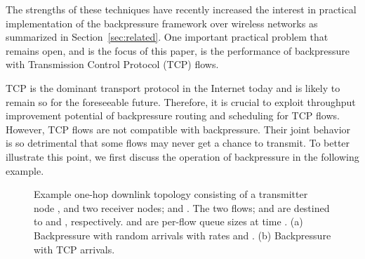 \documentclass[conference]{IEEEtran}
\begin{document}
The strengths of these techniques have recently increased the interest in practical implementation of the backpressure framework over wireless networks as summarized in Section~\ref{sec:related}. One important practical problem that remains open, and is the focus of this paper, is the performance of backpressure with Transmission Control Protocol (TCP) flows.



TCP is the dominant transport protocol in the Internet today and is likely to remain so for the foreseeable future. Therefore, it is crucial to exploit throughput improvement potential of backpressure routing and scheduling for TCP flows. However, TCP flows are not compatible with backpressure.
Their joint behavior is so detrimental that some flows may never get a chance to transmit. To better illustrate this point, we first discuss the operation of backpressure in the following example.

\begin{figure}[t!]
\vspace{-10pt}
\centering
{}
\vspace{-5pt}
\caption{\scriptsize  Example one-hop downlink topology consisting of a transmitter node , and two receiver nodes;  and . The two flows;  and  are destined to  and , respectively.  and  are per-flow queue sizes at time . (a) Backpressure with random arrivals with rates  and . (b) Backpressure with TCP arrivals.  }
\vspace{-20pt}
\label{fig:intro_example}
\end{figure}
\end{document}
